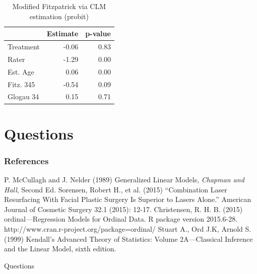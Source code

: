 \documentclass{beamer}
\begin{document}
\begin{frame}
  \begin{table}[]
  \centering
  \caption{Modified Fitzpatrick via CLM estimation (probit)}
  \label{my-label}
  \begin{tabular}{lrr} \hline
            & Estimate & p-value \\ \hline \hline
  Treatment & -0.06    & 0.83    \\
  Rater     & -1.29    & 0.00    \\
  Est. Age  &  0.06    & 0.00    \\
  Fitz. 345 & -0.54    & 0.09    \\
  Glogau 34 &  0.15    & 0.71    \\ \hline
  \end{tabular}
  \end{table}
\end{frame}

\section{Questions}
\begin{frame}
\frametitle{References}
  \footnotesize{
  \begin{thebibliography}{99}
   P. McCullagh and J. Nelder (1989)
  \newblock Generalized Linear Models, \emph{Chapman and Hall}, Second Ed.
   Sorensen, Robert H., et al. (2015)
  \newblock ``Combination Laser Resurfacing With Facial Plastic Surgery Is Superior to Lasers Alone.'' American Journal of Cosmetic Surgery 32.1 (2015): 12-17.
   Christensen, R. H. B. (2015)
  \newblock ordinal---Regression Models for Ordinal Data. R package version 2015.6-28.
      http://www.cran.r-project.org/package=ordinal/
  Stuart A., Ord J.K, Arnold S. (1999)
  \newblock Kendall's Advanced Theory of Statistics: Volume 2A---Classical Inference and the Linear Model, sixth edition.
  \end{thebibliography}
  }
\end{frame}
\begin{frame}
\Huge{\centerline{Questions}}
\end{frame}
\end{document}
